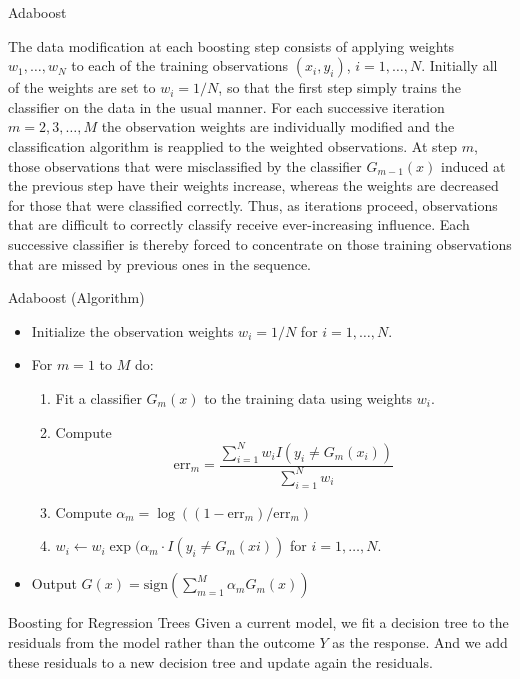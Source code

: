 \documentclass{beamer}
\begin{document}
\begin{frame}{Adaboost}
	
	The data modification at each boosting step consists of applying weights $w_1,\ldots, w_N$ to each of the training observations $(x_i,y_i)$, $i=1,\ldots, N$. Initially all of the weights are set to $w_i = 1/N$, so that the first step simply trains the classifier on the data in the usual manner. For each successive iteration $m=2,3, \ldots, M$ the observation weights are individually modified and the classification algorithm is reapplied to the weighted observations. At step $m$, those observations that were misclassified by the classifier $G_{m-1}(x)$ induced at the previous step have their weights increase, whereas the weights are decreased for those that were classified correctly. Thus, as iterations proceed, observations that are difficult to correctly classify receive ever-increasing influence. Each successive classifier is thereby forced to concentrate on those training observations that are missed by previous ones in the sequence. 
	
\end{frame}
\begin{frame}{Adaboost (Algorithm)}
	\begin{itemize}
		\item Initialize the observation weights $w_i=1/N$ for $i=1,\ldots, N$.
		\item For $m=1$ to $M$ do:
		\begin{enumerate}
			\item Fit a classifier $G_m(x)$ to the training data using weights $w_i$.
			\item Compute
			\begin{equation*}
				\text{err}_m = \frac{\sum_{i=1}^N w_i I(y_i\ne G_m(x_i))}{\sum_{i=1}^{N}w_i}
			\end{equation*}
			\item Compute $\alpha_m = \log((1- \text{err}_m)/\text{err}_m)$
			\item $w_i \leftarrow w_i \exp( \alpha_m \cdot I (y_i \ne G_m(xi))$ for $i=1, \ldots, N$.
		\end{enumerate}
	\item Output $G(x)= \text{sign} \left(\sum_{m=1}^M\alpha_m G_m(x)\right)$
	\end{itemize}
\end{frame}

\begin{frame}{Boosting for Regression Trees}
	Given a current model, we fit a decision tree to the residuals from the model rather than the outcome $Y$ as the response. And we add these residuals to a new decision tree and update again the residuals. 
	
	 \end{frame}
\end{document}
